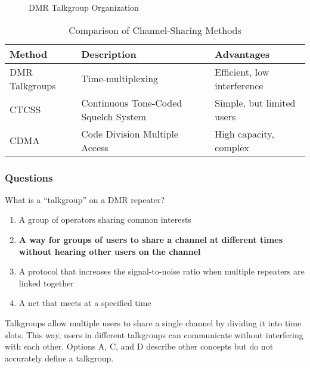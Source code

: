 \begin{figure}[h]
    \centering
    \caption{DMR Talkgroup Organization}
    \label{fig:dmr-talkgroups}
\end{figure}

\begin{table}[h]
    \centering
    \begin{tabular}{|l|l|l|}
        \hline
        \textbf{Method} & \textbf{Description} & \textbf{Advantages} \\
        \hline
        DMR Talkgroups & Time-multiplexing & Efficient, low interference \\
        CTCSS & Continuous Tone-Coded Squelch System & Simple, but limited users \\
        CDMA & Code Division Multiple Access & High capacity, complex \\
        \hline
    \end{tabular}
    \caption{Comparison of Channel-Sharing Methods}
    \label{tab:channel-sharing-comparison}
\end{table}

\subsubsection{Questions}

\begin{tcolorbox}[colback=gray!10!white,colframe=black!75!black,title={T8D02}]
    What is a “talkgroup” on a DMR repeater?
    \begin{enumerate}[label=\Alph*),noitemsep]
        \item A group of operators sharing common interests
        \item \textbf{A way for groups of users to share a channel at different times without hearing other users on the channel}
        \item A protocol that increases the signal-to-noise ratio when multiple repeaters are linked together
        \item A net that meets at a specified time
    \end{enumerate}
\end{tcolorbox}

Talkgroups allow multiple users to share a single channel by dividing it into time slots. This way, users in different talkgroups can communicate without interfering with each other. Options A, C, and D describe other concepts but do not accurately define a talkgroup.

